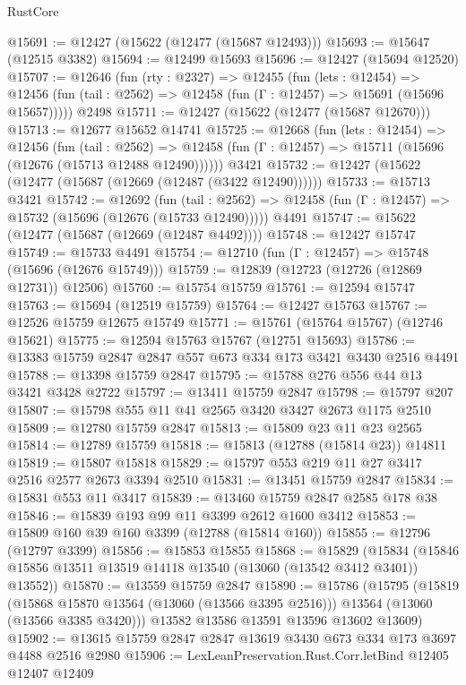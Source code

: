 \begin{lexlean}{RustCore}
\begin{coremodule}
@15691 := @12427 (@15622 (@12477 (@15687 @12493)))
@15693 := @15647 (@12515 @3382)
@15694 := @12499 @15693
@15696 := @12427 (@15694 @12520)
@15707 := @12646
    (fun (rty : @2327) =>
    @12455
      (fun (lets : @12454) =>
      @12456 (fun (tail : @2562) => @12458 (fun (Γ : @12457) => @15691 (@15696 @15657)))))
    @2498
@15711 := @12427 (@15622 (@12477 (@15687 @12670)))
@15713 := @12677 @15652 @14741
@15725 := @12668
    (fun (lets : @12454) =>
    @12456
      (fun (tail : @2562) =>
      @12458 (fun (Γ : @12457) => @15711 (@15696 (@12676 (@15713 @12488 @12490))))))
    @3421
@15732 := @12427 (@15622 (@12477 (@15687 (@12669 (@12487 (@3422 @12490))))))
@15733 := @15713 @3421
@15742 := @12692
    (fun (tail : @2562) => @12458 (fun (Γ : @12457) => @15732 (@15696 (@12676 (@15733 @12490)))))
    @4491
@15747 := @15622 (@12477 (@15687 (@12669 (@12487 @4492))))
@15748 := @12427 @15747
@15749 := @15733 @4491
@15754 := @12710 (fun (Γ : @12457) => @15748 (@15696 (@12676 @15749)))
@15759 := @12839 (@12723 (@12726 (@12869 @12731)) @12506)
@15760 := @15754 @15759
@15761 := @12594 @15747
@15763 := @15694 (@12519 @15759)
@15764 := @12427 @15763
@15767 := @12526 @15759 @12675 @15749
@15771 := @15761 (@15764 @15767) (@12746 @15621)
@15775 := @12594 @15763 @15767 (@12751 @15693)
@15786 := @13383 @15759 @2847 @2847 @557 @673 @334 @173 @3421 @3430 @2516 @4491
@15788 := @13398 @15759 @2847
@15795 := @15788 @276 @556 @44 @13 @3421 @3428 @2722
@15797 := @13411 @15759 @2847
@15798 := @15797 @207
@15807 := @15798 @555 @11 @41 @2565 @3420 @3427 @2673 @1175 @2510
@15809 := @12780 @15759 @2847
@15813 := @15809 @23 @11 @23 @2565
@15814 := @12789 @15759
@15818 := @15813 (@12788 (@15814 @23)) @14811
@15819 := @15807 @15818
@15829 := @15797 @553 @219 @11 @27 @3417 @2516 @2577 @2673 @3394 @2510
@15831 := @13451 @15759 @2847
@15834 := @15831 @553 @11 @3417
@15839 := @13460 @15759 @2847 @2585 @178 @38
@15846 := @15839 @193 @99 @11 @3399 @2612 @1600 @3412
@15853 := @15809 @160 @39 @160 @3399 (@12788 (@15814 @160))
@15855 := @12796 (@12797 @3399)
@15856 := @15853 @15855
@15868 := @15829
    (@15834 (@15846 @15856 @13511 @13519 @14118 @13540 (@13060 (@13542 @3412 @3401)) @13552))
@15870 := @13559 @15759 @2847
@15890 := @15786
    (@15795
      (@15819
        (@15868 @15870 @13564 (@13060 (@13566 @3395 @2516)))
        @13564
        (@13060 (@13566 @3385 @3420)))
      @13582
      @13586
      @13591
      @13596
      @13602
      @13609)
@15902 := @13615 @15759 @2847 @2847 @13619 @3430 @673 @334 @173 @3697 @4488 @2516 @2980
@15906 := LexLeanPreservation.Rust.Corr.letBind @12405 @12407 @12409

\end{coremodule}
\end{lexlean}
